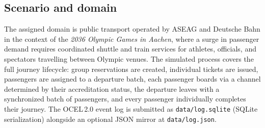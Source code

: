 \subsection*{Scenario and domain}

The assigned domain is public transport operated by ASEAG and Deutsche Bahn
in the context of the \emph{2036 Olympic Games in Aachen}, where a surge in
passenger demand requires coordinated shuttle and train services for athletes,
officials, and spectators travelling between Olympic venues.
The simulated process covers the full journey lifecycle: group reservations are
created, individual tickets are issued, passengers are assigned to a departure
batch, each passenger boards via a channel determined by their accreditation
status, the departure leaves with a synchronized batch of passengers, and every
passenger individually completes their journey.
The OCEL\,2.0 event log is submitted as \texttt{data/log.sqlite} (SQLite
serialization) alongside an optional JSON mirror at \texttt{data/log.json}.
